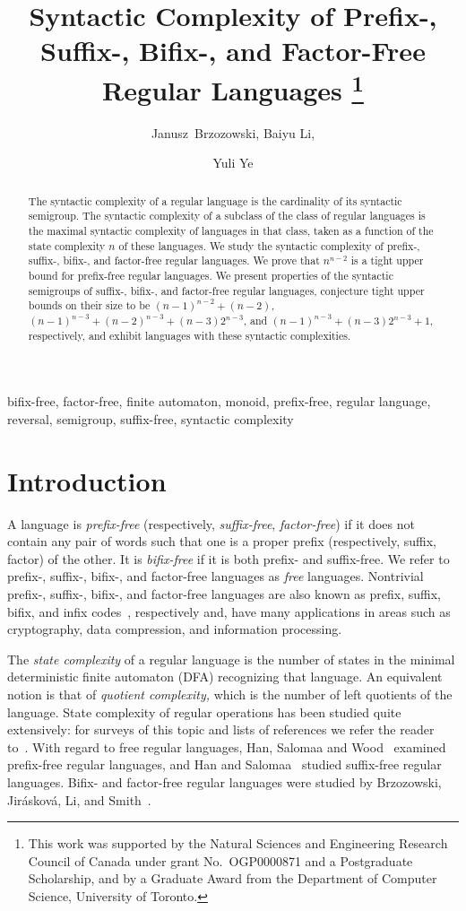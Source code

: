\documentclass{llncs}
\title{Syntactic Complexity of Prefix-, Suffix-, Bifix-, and Factor-Free Regular Languages
\thanks{This work was supported by the Natural Sciences and Engineering Research Council of Canada under grant No.~OGP0000871 and  a Postgraduate Scholarship, and by a Graduate Award from the Department of Computer Science, University of Toronto.
}}
\author{Janusz~Brzozowski\inst{1}, Baiyu Li\inst{1}, \and Yuli Ye\inst{2}}
\institute{David R. Cheriton School of Computer Science, University of Waterloo \\
Waterloo, ON, Canada N2L 3G1\\
email: \email{\{brzozo, b5li\}@uwaterloo.ca}
\and
Department of Computer Science, University of Toronto\\
 Toronto, ON,  Canada M5S 3G4\\
email: \email{y3ye@cs.toronto.edu}
}
\newcommand{\noin}{\noindent}
\begin{document}
\maketitle

\begin{abstract}
The syntactic complexity of a regular language is the cardinality of its syntactic semigroup.
The syntactic complexity of a subclass of the class of regular languages is the maximal syntactic complexity of languages in that class, taken as a function of the state complexity $n$ of these languages.
We study the syntactic complexity of  prefix-, suffix-, bifix-, and factor-free regular languages.
We prove that $n^{n-2}$ is a tight upper bound for prefix-free regular languages. We present properties of the syntactic semigroups of suffix-, bifix-, and factor-free regular languages, conjecture tight upper bounds on their size to be $(n-1)^{n-2}+(n-2)$, $(n-1)^{n-3} + (n-2)^{n-3} + (n-3)2^{n-3}$, and $(n-1)^{n-3} + (n-3)2^{n-3} + 1$, respectively, and exhibit languages with these syntactic complexities.
\end{abstract}

\noin{\bf keyword}
bifix-free, factor-free, finite automaton, monoid, prefix-free, regular language, reversal, semigroup,  suffix-free, syntactic complexity 

\section{Introduction}

A language is \emph{prefix-free} (respectively, \emph{suffix-free}, \emph{factor-free}) if it does not contain any pair of words such that one is a proper prefix (respectively, suffix, factor) of the other. It is \emph{bifix-free} if it is both prefix- and suffix-free.
We refer to  prefix-, suffix-, bifix-, and factor-free languages as \emph{free} languages.
Nontrivial prefix-, suffix-, bifix-, and factor-free languages are also known as prefix, suffix, bifix, and infix codes~\cite{BPR09,Shy01}, respectively and, have many applications in areas such as cryptography, data compression, and information processing. 


The \emph{state complexity} of a regular language is the  number of states in the minimal deterministic finite automaton (DFA) recognizing that language. 
An equivalent notion is that of \emph{quotient complexity,} which is the number of left quotients of the language.
State complexity of regular operations has been studied quite extensively: for surveys of this topic and lists of references we refer the reader to~\cite{Brz09,Yu01}. 
With regard to free regular languages,  Han, Salomaa and Wood~\cite{HSW09} examined  prefix-free regular languages, and  Han and Salomaa~\cite{HS09} studied suffix-free regular languages. 
Bifix- and factor-free regular languages were studied by Brzozowski, Jir\'askov\'a, Li, and Smith~\cite{BJLS11}. 
\end{document}
